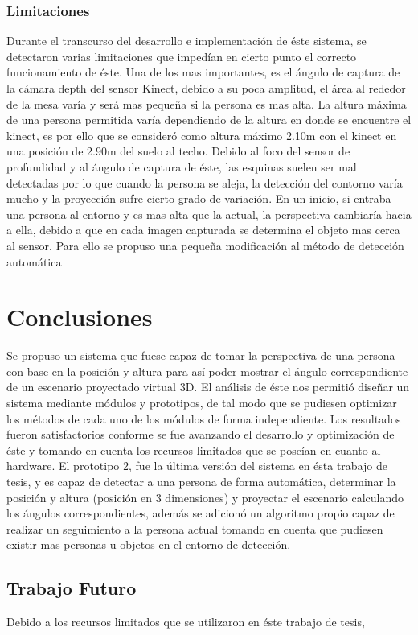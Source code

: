 \documentclass[a4paper,openright,12pt]{report}
\begin{document}
\subsection{Limitaciones}
Durante el transcurso del desarrollo e implementación de éste sistema, se detectaron varias limitaciones que impedían en cierto punto el correcto funcionamiento de éste. Una de los mas importantes, es el ángulo de captura de la cámara depth del sensor Kinect, debido a su poca amplitud, el área al rededor de la mesa varía y será mas pequeña si la persona es mas alta. La altura máxima de una persona permitida varía dependiendo de la altura en donde se encuentre el kinect, es por ello que se consideró como altura máximo 2.10m con el kinect en una posición de 2.90m del suelo al techo. Debido al foco del sensor de profundidad y al ángulo de captura de éste, las esquinas suelen ser mal detectadas por lo que cuando la persona se aleja, la detección del contorno varía mucho y la proyección sufre cierto grado de variación. En un inicio, si entraba una persona al entorno y es mas alta que la actual, la perspectiva cambiaría hacia a ella, debido a que en cada imagen capturada se determina el objeto mas cerca al sensor. Para ello se propuso una pequeña modificación al método de detección automática

\chapter{Conclusiones}\label{cap.conclusiones}
Se propuso un sistema que fuese capaz de tomar la perspectiva de una persona con base en la posición y altura para así poder mostrar el ángulo correspondiente de un escenario proyectado virtual 3D. El análisis de éste nos permitió diseñar un sistema mediante módulos y prototipos, de tal modo que se pudiesen optimizar los métodos de cada uno de los módulos de forma independiente. Los resultados fueron satisfactorios conforme se fue avanzando el desarrollo y optimización de éste y tomando en cuenta los recursos limitados que se poseían en cuanto al hardware. El prototipo 2, fue la última versión del sistema en ésta trabajo de tesis, y es capaz de detectar a una persona de forma automática, determinar la posición y altura (posición en 3 dimensiones) y proyectar el escenario calculando los ángulos correspondientes, además se adicionó un algoritmo propio capaz de realizar un seguimiento a la persona actual tomando en cuenta que pudiesen existir mas personas u objetos en el entorno de detección.

\section{Trabajo Futuro}
Debido a los recursos limitados que se utilizaron en éste trabajo de tesis, 


\cleardoublepage
{}


\end{document}
